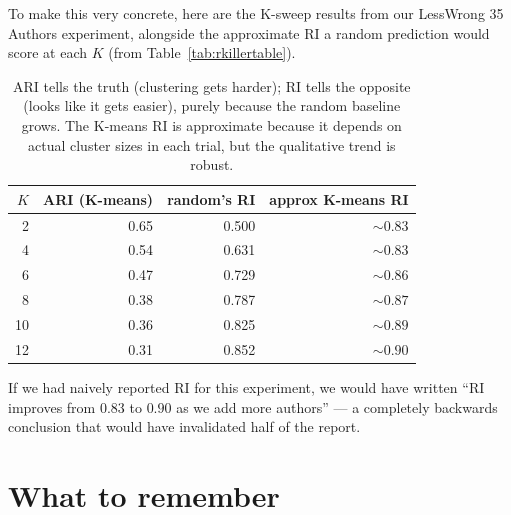 \documentclass[11pt]{article}
\begin{document}
To make this very concrete, here are the K-sweep results from our
LessWrong 35 Authors experiment, alongside the approximate RI a random
prediction would score at each $K$ (from Table~\ref{tab:rkillertable}).

\begin{table}[H]
\centering
\small
\begin{tabular}{r r r r}
\toprule
$K$ & ARI (K-means) & random's RI & approx K-means RI \\
\midrule
2  & 0.65 & 0.500 & $\sim 0.83$ \\
4  & 0.54 & 0.631 & $\sim 0.83$ \\
6  & 0.47 & 0.729 & $\sim 0.86$ \\
8  & 0.38 & 0.787 & $\sim 0.87$ \\
10 & 0.36 & 0.825 & $\sim 0.89$ \\
12 & 0.31 & 0.852 & $\sim 0.90$ \\
\bottomrule
\end{tabular}
\caption{ARI tells the truth (clustering gets harder); RI tells the
opposite (looks like it gets easier), purely because the random baseline
grows. The K-means RI is approximate because it depends on actual cluster
sizes in each trial, but the qualitative trend is robust.}
\end{table}

If we had naively reported RI for this experiment, we would have written
``RI improves from $0.83$ to $0.90$ as we add more authors'' --- a
completely backwards conclusion that would have invalidated half of the
report.

\section{What to remember}
\end{document}
